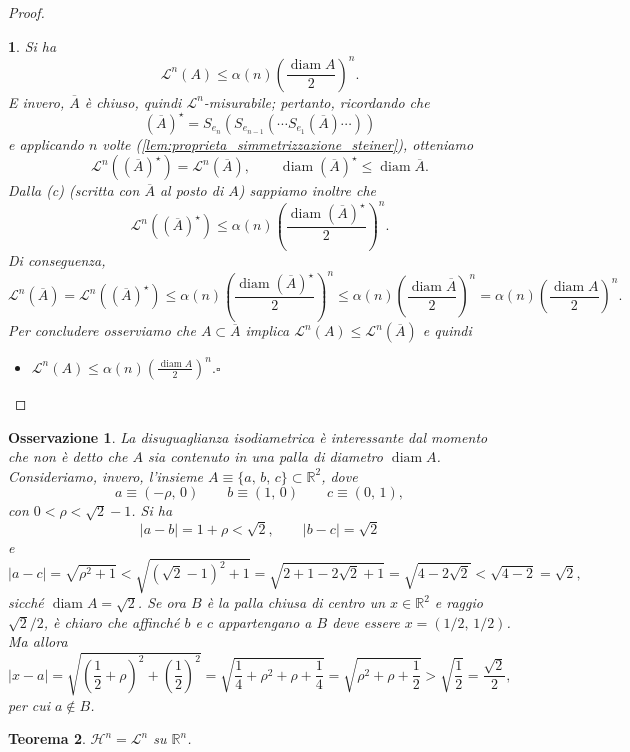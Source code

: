 \documentclass[a4paper,10pt,openright,oneside]{book}
\theoremstyle{theoremstyle}
\newtheorem{teorema}{Teorema}[section]
\theoremstyle{theoremstylewoheader}
\theoremstyle{theoremstyle}
\newtheorem{osservazione}[teorema]{Osservazione}
\theoremstyle{proofsecstyle}
\newtheorem{proofsec}{}
\theoremstyle{nonumberplain}
\newtheorem{proof}{Dim.}
\newcommand{\RR}{\ensuremath{\mathbb{R}}}
\newcommand{\Leb}{\ensuremath{\mathcal{L}}}
\newcommand{\Haus}{\ensuremath{\mathcal{H}}}
\newcommand{\abs}[1]{\ensuremath{\lvert #1 \rvert}}
\newcommand{\closure}[1]{\ensuremath{\overline{#1}}}
\DeclareMathOperator{\diam}{diam}
\renewcommand{\qedsymbol}{\ensuremath{\square}}
\newcommand{\mymath}[2]{\begin{itemize}%
  \item[]\hfill\hbox{}\ensuremath{\displaystyle #1}\hfill\ensuremath{\displaystyle #2}%
  \end{itemize}}
\begin{document}
\begin{proof}
\begin{proofsec}
\emph{Si ha}
\[
\Leb^n(A) \le \alpha(n) \left(\frac{\diam A}{2}\right)^n.
\]
E invero, $\closure{A}$ è chiuso, quindi $\Leb^n$-misurabile; pertanto, ricordando che
\[
(\closure{A})^\star = S_{e_n} (S_{e_{n-1}} ( \cdots S_{e_1} (\closure{A}) \cdots ))
\]
e applicando $n$ volte (\ref{lem:proprieta_simmetrizzazione_steiner}), otteniamo
\[
\Leb^n((\closure{A})^\star) = \Leb^n(\closure{A}),\qquad \diam(\closure{A})^\star \le \diam \closure{A}.
\]
Dalla (c) (scritta con $\closure{A}$ al posto di $A$) sappiamo inoltre che
\[
\displaystyle\Leb^n((\closure{A})^\star) \le \alpha(n) \left(\frac{\diam (\closure{A})^\star}{2}\right)^n.
\]
Di conseguenza,
\[
\Leb^n(\closure{A}) = \Leb^n((\closure{A})^\star) \le \alpha(n) \left(\frac{\diam (\closure{A})^\star}{2}\right)^n \le \alpha(n) \left(\frac{\diam \closure{A}}{2}\right)^n = \alpha(n) \left(\frac{\diam A}{2}\right)^n.
\]
Per concludere osserviamo che $A \subset \closure{A}$ implica $\Leb^n(A) \le \Leb^n(\closure{A})$ e quindi
\mymath{\Leb^n(A) \le \alpha(n) \left(\frac{\diam A}{2}\right)^n.}{\qedsymbol}
\end{proofsec}
\end{proof}

\begin{osservazione}
La disuguaglianza isodiametrica è interessante dal momento che non è detto che $A$ sia contenuto in una palla di diametro $\diam A$. Consideriamo, invero, l'insieme $A \equiv \{a,\, b,\, c\} \subset \RR^2$, dove
\[
a \equiv (-\rho,\, 0)\qquad b \equiv (1,\, 0)\qquad c \equiv (0,\, 1),
\]
con $0 < \rho < \sqrt{2}-1$. Si ha
\[
\abs{a-b} = 1 + \rho < \sqrt{2},\qquad \abs{b-c} = \sqrt{2}
\]
e
\[
\abs{a-c} = \sqrt{\rho^2 + 1} < \sqrt{(\sqrt{2}-1)^2 + 1} = \sqrt{2 + 1 - 2\sqrt{2} + 1} = \sqrt{4 - 2\sqrt{2}} < \sqrt{4 - 2} = \sqrt{2},
\]
sicché $\diam A = \sqrt{2}$. Se ora $B$ è la palla chiusa di centro un $x \in \RR^2$ e raggio $\sqrt{2}/2$, è chiaro che affinché $b$ e $c$ appartengano a $B$ deve essere $x = (1/2,\, 1/2)$. Ma allora
\[
\abs{x-a} = \sqrt{\left(\frac{1}{2} + \rho\right)^2 + \left(\frac{1}{2}\right)^2} = \sqrt{\frac{1}{4} + \rho^2 + \rho + \frac{1}{4}} = \sqrt{\rho^2 + \rho + \frac{1}{2}} > \sqrt{\frac{1}{2}} = \frac{\sqrt{2}}{2},
\]
per cui $a \notin B$.
\end{osservazione}

\begin{teorema}
\label{thm:hausdorff_uguale_lebesgue}
$\Haus^n = \Leb^n$ su $\RR^n$.
\end{teorema}
\end{document}
